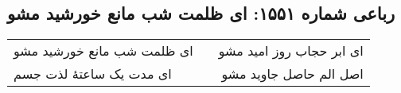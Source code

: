 \begin{center}
\section*{رباعی شماره ۱۵۵۱: ای ظلمت شب مانع خورشید مشو}
\label{sec:1551}
\begin{longtable}{l p{0.5cm} r}
ای ظلمت شب مانع خورشید مشو
&&
ای ابر حجاب روز امید مشو
\\
ای مدت یک ساعتهٔ لذت جسم
&&
اصل الم حاصل جاوید مشو
\\
\end{longtable}
\end{center}
